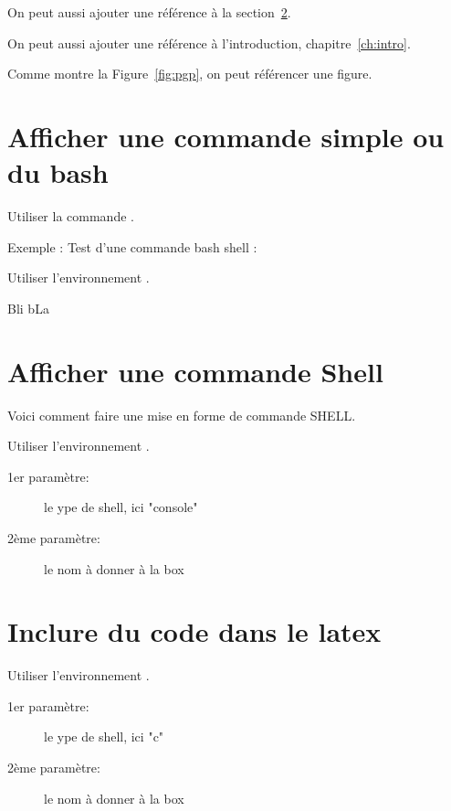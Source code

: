 On peut aussi ajouter une référence à la section~\ref{sec:shell}.

On peut aussi ajouter une référence à l'introduction, chapitre~\ref{ch:intro}.

Comme montre la Figure~\ref{fig:pgp}, on peut référencer une figure.


\section{Afficher une commande simple ou du bash}

Utiliser la commande .

Exemple : Test d'une commande bash shell  : 

Utiliser l'environnement .

Bli bLa


\section{Afficher une commande Shell}
\label{sec:shell}

Voici comment faire une mise en forme de commande SHELL.

Utiliser l'environnement .
\begin{description}
 \item[1er paramètre:] le ype de shell, ici "console"
 \item[2ème paramètre:] le nom à donner à la box
\end{description}



\section{Inclure du code dans le latex}

Utiliser l'environnement .
\begin{description}
 \item[1er paramètre:] le ype de shell, ici "c"
 \item[2ème paramètre:] le nom à donner à la box
\end{description}

